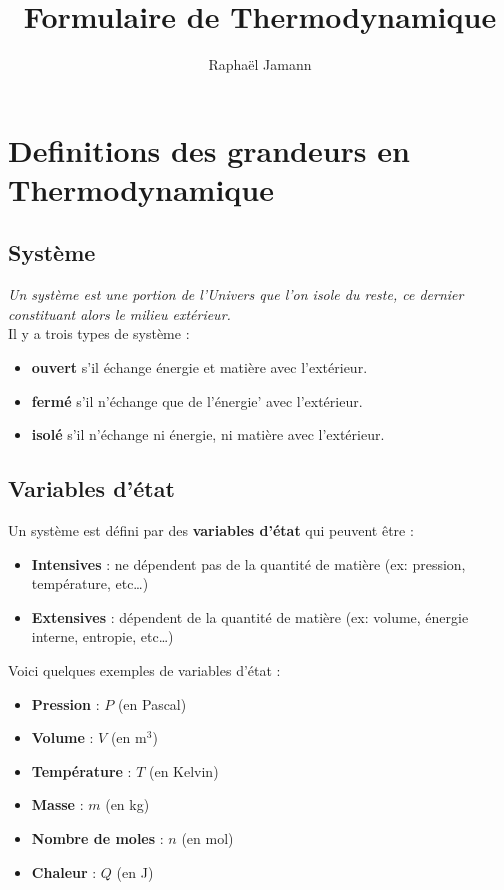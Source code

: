 \documentclass[a4paper,12pt]{article}
\title{Formulaire de Thermodynamique}
\author{Raphaël Jamann}
\date{}
\begin{document}
\maketitle


\section{Definitions des grandeurs en Thermodynamique}

    \begin{multicols}{2}

    \subsection*{Système}

    \textit{Un système est une portion de l'Univers que l'on isole du reste,
    ce dernier constituant alors le milieu extérieur.}\\
    Il y a trois types de système :
    \begin{itemize}[label=\textbullet]
        \item \textbf{ouvert} s'il échange énergie et matière avec l'extérieur.
        \item \textbf{fermé} s'il n'échange que de l'énergie' avec l'extérieur.
        \item \textbf{isolé} s'il n'échange ni énergie, ni matière avec l'extérieur.
    \end{itemize}

    \subsection*{Variables d'état}
    Un système est défini par des \textbf{variables d'état} qui peuvent être :
    \begin{itemize}[label=\textbullet]
        \item \textbf{Intensives} : ne dépendent pas de la quantité de matière (ex: pression, température, etc\dots)
        \item \textbf{Extensives} : dépendent de la quantité de matière (ex: volume, énergie interne, entropie, etc\dots)
    \end{itemize}

    \noindent Voici quelques exemples de variables d'état :
    \begin{itemize}[label=\textbullet]
        \item \textbf{Pression} : $P$ (en Pascal)
        \item \textbf{Volume} : $V$ (en m$^3$)
        \item \textbf{Température} : $T$ (en Kelvin)
        \item \textbf{Masse} : $m$ (en kg)
        \item \textbf{Nombre de moles} : $n$ (en mol)
        \item \textbf{Chaleur} : $Q$ (en J)
    \end{itemize}


\end{multicols}
\end{document}
